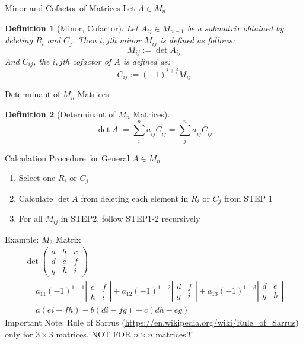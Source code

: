 \documentclass[a4paper,11pt]{article}
\newtheorem{defn}{Definition}
\begin{document}
\begin{frame}[t]{Minor and Cofactor of Matrices}
	Let $A\in M_n$
	\begin{defn}
		[Minor, Cofactor]
		Let $A_{ij}\in M_{n-1}$ be a submatrix obtained by deleting $R_i$ and $C_j$. Then $i,j$th minor $M_{ij}$ is defined as follows:
		\[
			M_{ij}:= \det A_{ij}
		\]
		And $C_{ij}$, the $i,j$th cofactor of $A$ is defined as:
		\[
			C_{ij}:= (-1)^{i+j}M_{ij}
		\]
	\end{defn}

\end{frame}
\begin{frame}[t]{Determinant of $M_n$ Matrices}
	\begin{defn}
		[Determinant of $M_n$ Matrices]
		\[
			\det A := \sum_i^n a_{i \bar j}C_{i \bar j} = \sum_j^n a_{\bar i j}C_{\bar i j}
		\]
	\end{defn}
	\begin{block}
		{Calculation Procedure for General $A\in M_n$}
		\begin{enumerate}[STEP 1:]
			\item Select one $R_i$ or $C_j$
			\item Calculate $\det A$ from deleting each element in $R_i$ or $C_j$ from STEP 1
			\item For all $M_{ij}$ in STEP2, follow STEP1-2 recursively
		\end{enumerate}
	\end{block}
\end{frame}

\begin{frame}[t]{Example: $M_3$ Matrix}
	\begin{multline*}
		\det \begin{pmatrix}
			a &b & c \\
			d&e&f\\
			g&h&i
		\end{pmatrix} 
		\\= a_{11} (-1)^{1+1}\left\vert \begin{matrix}
			e&f\\
			h&i
		\end{matrix}\right\vert + a_{12} (-1)^{1+2}\left\vert \begin{matrix}
			d&f\\
			g&i
		\end{matrix}\right\vert + a_{13} (-1)^{1+3}\left\vert \begin{matrix}
			d&e\\
			g&h
		\end{matrix}\right\vert 
		\\= a(ei-fh)-b(di-fg)+c(dh-eg)
	\end{multline*}
	Important Note: Rule of Sarrus (\url{https://en.wikipedia.org/wiki/Rule_of_Sarrus}) only for $3\times 3$ matrices, NOT FOR $n\times n$ matrices!!!
\end{frame}
\end{document}

